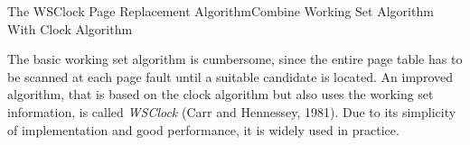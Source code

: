

\begin{frame}{The WSClock Page Replacement Algorithm}{Combine Working Set Algorithm With
    Clock Algorithm}
  \begin{center}
  \end{center}
\end{frame}

The basic working set algorithm is cumbersome, since the entire page table has to be
scanned at each page fault until a suitable candidate is located. An improved algorithm,
that is based on the clock algorithm but also uses the working set information, is called
\emph{WSClock} (Carr and Hennessey, 1981). Due to its simplicity of implementation and
good performance, it is widely used in practice.

